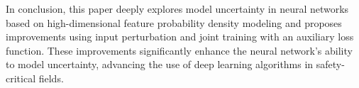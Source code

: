 \documentclass[type=master,twoside]{fduthesis}
\begin{document}
\begin{abstract*}
In conclusion, this paper deeply explores model uncertainty in neural networks based on high-dimensional feature probability density modeling and proposes improvements using input perturbation and joint training with an auxiliary loss function. These improvements significantly enhance the neural network's ability to model uncertainty, advancing the use of deep learning algorithms in safety-critical fields.
\end{abstract*}

  


\mainmatter

%   
%   
%   












\backmatter

\printbibliography
\end{document}

